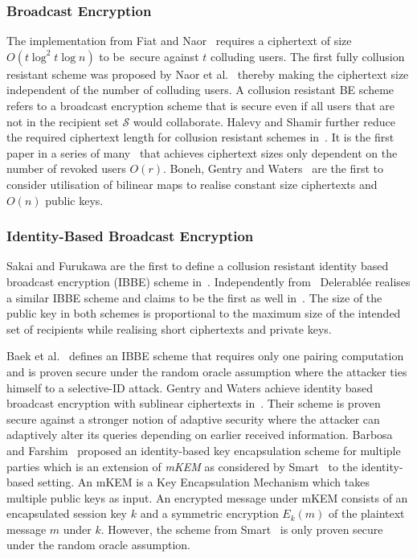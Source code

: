 \subsubsection{Broadcast Encryption}
The implementation from Fiat and Naor~\cite{art:FiatN93} requires a ciphertext of size  $O \left( t \log^2 t \log n \right)$ to be~secure against $t$ colluding users. The first fully collusion resistant scheme was proposed by Naor et al.~\cite{art:NaorNL01} thereby making the ciphertext size independent of the number of colluding users. A collusion resistant BE scheme refers to a broadcast encryption scheme that is secure even if all users that are not in the recipient set $\mathcal{S}$ would collaborate. Halevy and Shamir further reduce the required ciphertext length for collusion resistant schemes in~\cite{art:HalevyS02}. It is the first paper in a series of many~\cite{art:DodisF02,art:GoodrichST04,art:LewkoSW08} that achieves ciphertext sizes only dependent on the number of revoked users $O \left( r \right)$. Boneh, Gentry and Waters~\cite{art:BonehBG05} are the first to consider utilisation of bilinear maps to realise constant size ciphertexts and $O \left( n \right)$ public keys.

\subsubsection{Identity-Based Broadcast Encryption}
Sakai and Furukawa are the first to define a collusion resistant identity based broadcast encryption (IBBE) scheme in~\cite{art:SakaiF07}. Independently from~\cite{art:SakaiF07} Delerabl\'{e}e realises a similar IBBE scheme and claims to be the first as well in~\cite{art:Delerablee07}.  The size of the public key in both schemes is proportional to the maximum size of the intended set of recipients while realising short ciphertexts and private keys. 

Baek et al.~\cite{art:BaekNSS04} defines an IBBE scheme that requires only one pairing computation and is proven secure under the random oracle assumption where the attacker ties himself to a selective-ID attack. Gentry and Waters achieve identity based broadcast encryption with sublinear ciphertexts in~\cite{art:GentryW08}. Their scheme is proven secure against a stronger notion of adaptive security where the attacker can adaptively alter its queries depending on earlier received information. Barbosa and Farshim~\cite{art:BarbosaF05} proposed an identity-based key encapsulation scheme for multiple parties which is an extension of \textit{mKEM} as considered by Smart~\cite{art:Smart04} to the identity-based setting. An mKEM is a Key Encapsulation Mechanism which takes multiple public keys as input. An encrypted message under mKEM consists of an encapsulated session key $k$ and a symmetric encryption $E_k \left( m \right)$ of the plaintext message $m$ under $k$. However, the scheme from Smart~\cite{art:Smart04} is only proven secure under the random oracle assumption.

